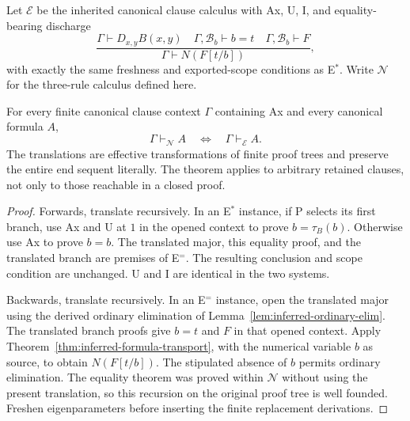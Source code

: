 Let $\mathcal E$ be the inherited canonical clause calculus with Ax, U,
I, and equality-bearing discharge
\[
 \frac{\Gamma\vdash D_{x,y}B(x,y)\quad
       \Gamma,\mathcal B_b\vdash b=t\quad
       \Gamma,\mathcal B_b\vdash F}
      {\Gamma\vdash N(F[t/b])},
 \tag{E$^=$}
\]
with exactly the same freshness and exported-scope conditions as E$^*$.
Write $\mathcal N$ for the three-rule calculus defined here.

\begin{theorem}
\label{thm:inferred-equivalence}
For every finite canonical clause context $\Gamma$ containing Ax and every
canonical formula $A$,
\[
 \Gamma\vdash_{\mathcal N}A
 \quad\Longleftrightarrow\quad
 \Gamma\vdash_{\mathcal E}A.
\]
The translations are effective transformations of finite proof trees and
preserve the entire end sequent literally. The theorem applies to arbitrary
retained clauses, not only to those reachable in a closed proof.
\end{theorem}
\begin{proof}
Forwards, translate recursively. In an E$^*$ instance, if P selects its
first branch, use Ax and U at $1$ in the opened context to prove
$b=\tau_B(b)$. Otherwise use Ax to prove $b=b$. The translated major,
this equality proof, and the translated branch are premises of E$^=$.
The resulting conclusion and scope condition are unchanged. U and I are
identical in the two systems.

Backwards, translate recursively. In an E$^=$ instance, open the translated
major using the derived ordinary elimination of
Lemma~\ref{lem:inferred-ordinary-elim}. The translated branch proofs give
$b=t$ and $F$ in that opened context. Apply
Theorem~\ref{thm:inferred-formula-transport}, with the numerical variable $b$
as source, to obtain $N(F[t/b])$. The stipulated absence of $b$ permits
ordinary elimination. The equality theorem was proved within $\mathcal N$
without using the present translation, so this recursion on the original
proof tree is well founded. Freshen eigenparameters before inserting the
finite replacement derivations.
\end{proof}

